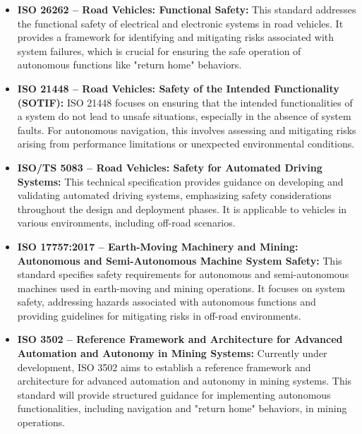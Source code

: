 \documentclass[runningheads]{llncs}
\begin{document}
\begin{itemize}

  \item \textbf{ISO 26262 – Road Vehicles: Functional Safety:} This standard addresses the functional safety of electrical and electronic systems in road vehicles. It provides a framework for identifying and mitigating risks associated with system failures, which is crucial for ensuring the safe operation of autonomous functions like "return home" behaviors.

  \item \textbf{ISO 21448 – Road Vehicles: Safety of the Intended Functionality (SOTIF):} ISO 21448 focuses on ensuring that the intended functionalities of a system do not lead to unsafe situations, especially in the absence of system faults. For autonomous navigation, this involves assessing and mitigating risks arising from performance limitations or unexpected environmental conditions.

  \item \textbf{ISO/TS 5083 – Road Vehicles: Safety for Automated Driving Systems:} This technical specification provides guidance on developing and validating automated driving systems, emphasizing safety considerations throughout the design and deployment phases. It is applicable to vehicles in various environments, including off-road scenarios.

  \item \textbf{ISO 17757:2017 – Earth-Moving Machinery and Mining: Autonomous and Semi-Autonomous Machine System Safety:} This standard specifies safety requirements for autonomous and semi-autonomous machines used in earth-moving and mining operations. It focuses on system safety, addressing hazards associated with autonomous functions and providing guidelines for mitigating risks in off-road environments.

  \item \textbf{ISO 3502 – Reference Framework and Architecture for Advanced Automation and Autonomy in Mining Systems:} Currently under development, ISO 3502 aims to establish a reference framework and architecture for advanced automation and autonomy in mining systems. This standard will provide structured guidance for implementing autonomous functionalities, including navigation and "return home" behaviors, in mining operations.


\end{itemize}
\end{document}
